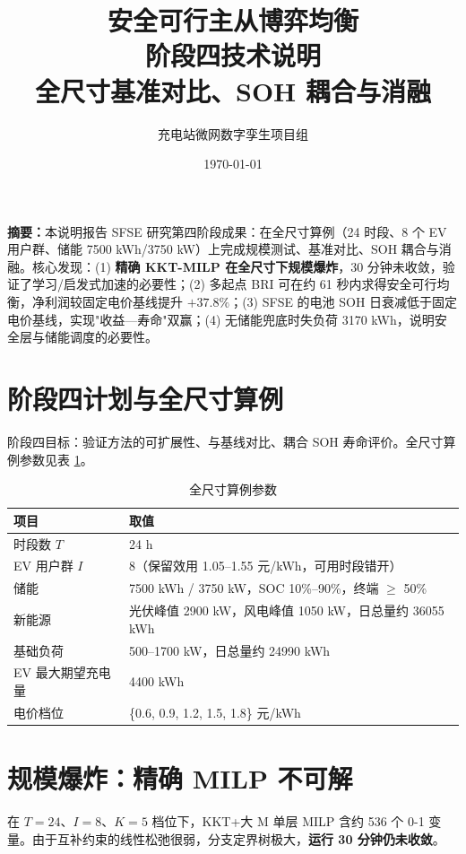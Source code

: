\documentclass[UTF8,a4paper,11pt]{ctexart}
\title{\vspace{-1.4cm}\textbf{\color{mainblue}安全可行主从博弈均衡\\阶段四技术说明}\\[6pt]
\large 全尺寸基准对比、SOH 耦合与消融}
\author{充电站微网数字孪生项目组}
\date{\today}
\begin{document}
\sloppy
\maketitle
\thispagestyle{fancy}

\begin{center}
\begin{minipage}{0.93\textwidth}
\small
\textbf{摘要：}本说明报告 SFSE 研究第四阶段成果：在全尺寸算例（24 时段、8 个 EV 用户群、储能 7500 kWh/3750 kW）上完成规模测试、基准对比、SOH 耦合与消融。核心发现：(1) \textbf{精确 KKT-MILP 在全尺寸下规模爆炸}，30 分钟未收敛，验证了学习/启发式加速的必要性；(2) 多起点 BRI 可在约 61 秒内求得安全可行均衡，净利润较固定电价基线提升 $+37.8\%$；(3) SFSE 的电池 SOH 日衰减低于固定电价基线，实现"收益—寿命"双赢；(4) 无储能兜底时失负荷 3170 kWh，说明安全层与储能调度的必要性。
\end{minipage}
\end{center}

\vspace{0.4cm}

\section{阶段四计划与全尺寸算例}
阶段四目标：验证方法的可扩展性、与基线对比、耦合 SOH 寿命评价。全尺寸算例参数见表 \ref{tab:case}。

\begin{table}[htbp]
\centering
\small
\caption{全尺寸算例参数}
\label{tab:case}
\begin{tabular}{p{4.6cm} p{9.4cm}}
\toprule
\textbf{项目} & \textbf{取值}\\
\midrule
时段数 $T$ & 24 h\\
EV 用户群 $I$ & 8（保留效用 1.05--1.55 元/kWh，可用时段错开）\\
储能 & 7500 kWh / 3750 kW，SOC 10\%--90\%，终端 $\ge$ 50\%\\
新能源 & 光伏峰值 2900 kW，风电峰值 1050 kW，日总量约 36055 kWh\\
基础负荷 & 500--1700 kW，日总量约 24990 kWh\\
EV 最大期望充电量 & 4400 kWh\\
电价档位 & \{0.6, 0.9, 1.2, 1.5, 1.8\} 元/kWh\\
\bottomrule
\end{tabular}
\end{table}

\section{规模爆炸：精确 MILP 不可解}
在 $T=24$、$I=8$、$K=5$ 档位下，KKT+大 M 单层 MILP 含约 536 个 0-1 变量。由于互补约束的线性松弛很弱，分支定界树极大，\textbf{运行 30 分钟仍未收敛}。
\end{document}
